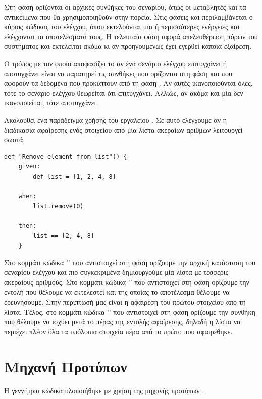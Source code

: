 Στη φάση  ορίζονται οι αρχικές συνθήκες του σεναρίου, 
όπως οι μεταβλητές και τα αντικείμενα που θα χρησιμοποιηθούν στην πορεία.
Στις φάσεις  και  περιλαμβάνεται ο κύριος κώδικας του ελέγχου,
όπου εκτελούνται μία ή περισσότερες ενέργειες και ελέγχονται τα αποτελέσματά τους.
Η τελευταία φάση  αφορά απελευθέρωση πόρων του συστήματος 
και εκτελείται ακόμα κι αν προηγουμένως έχει εγερθεί κάποια εξαίρεση. 

Ο τρόπος με τον οποίο αποφασίζει το  αν ένα σενάριο ελέγχου επιτυγχάνει ή αποτυγχάνει
είναι να παρατηρεί τις συνθήκες που ορίζονται στη φάση  
και που αφορούν τα δεδομένα που προκύπτουν από τη φάση .
Αν αυτές ικανοποιούνται όλες, 
τότε το σενάριο ελέγχου θεωρείται ότι επιτυγχάνει.
Αλλιώς, αν ακόμα και μία δεν ικανοποιείται, τότε αποτυγχάνει.

Ακολουθεί ένα παράδειγμα χρήσης του εργαλείου .
Σε αυτό ελέγχουμε αν η διαδικασία αφαίρεσης ενός στοιχείου από μία λίστα ακεραίων αριθμών λειτουργεί σωστά.

\begin{lstlisting}
def "Remove element from list"() {
    given:
        def list = [1, 2, 4, 8]

    when:
        list.remove(0)

    then:
        list == [2, 4, 8]
    }
\end{lstlisting}

Στο κομμάτι κώδικα '' που αντιστοιχεί στη φάση  ορίζουμε την αρχική κατάσταση του σεναρίου ελέγχου 
και πιο συγκεκριμένα δημιουργούμε μία λίστα με τέσσερις ακεραίους αριθμούς.
Στο κομμάτι κώδικα '' που αντιστοιχεί στη φάση  ορίζουμε την εντολή που θέλουμε να εκτελεστεί 
και της οποίας το αποτέλεσμα θέλουμε να ερευνήσουμε. Στην περίπτωσή μας είναι η αφαίρεση του πρώτου στοιχείου από τη λίστα.
Τέλος, στο κομμάτι κώδικα '' που αντιστοιχεί στη φάση  ορίζουμε την συνθήκη που θέλουμε να ισχύει 
μετά το πέρας της εντολής αφαίρεσης, δηλαδή η λίστα να περιέχει πλέον όλα τα υπόλοιπα στοιχεία πέρα από το πρώτο που αφαιρέθηκε.

 
\section{Μηχανή Προτύπων }
Η γεννήτρια κώδικα υλοποιήθηκε με χρήση της μηχανής προτύπων .

